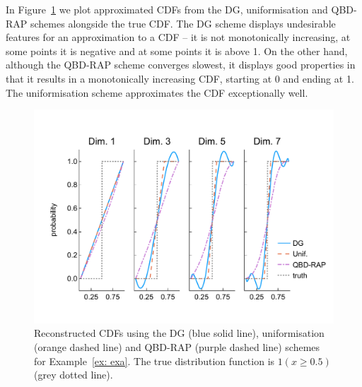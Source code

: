 \begin{example}
In Figure~\ref{fig: pdf comp fun 1} we plot approximated CDFs from the DG, uniformisation and QBD-RAP schemes alongside the true CDF. The DG scheme displays undesirable features for an approximation to a CDF -- it is not monotonically increasing, at some points it is negative and at some points it is above 1. On the other hand, although the QBD-RAP scheme converges slowest, it displays good properties in that it results in a monotonically increasing CDF, starting at 0 and ending at 1. The uniformisation scheme approximates the CDF exceptionally well.
\begin{figure}[h]
	\centering
	\includegraphics[width=\textwidth,trim={0cm 1.25cm 0cm 1.25cm},clip]{chapter6/figs/comp/fun1/cdfs_formatted.pdf}
	\caption{Reconstructed CDFs using the DG (blue solid line), uniformisation (orange dashed line) and QBD-RAP (purple dashed line) schemes for Example~\ref{ex: exa}. The true distribution function is \(1(x\geq 0.5)\) (grey dotted line).}
	\label{fig: pdf comp fun 1}
\end{figure} 
\exampleFloatBarrier
\end{example}

